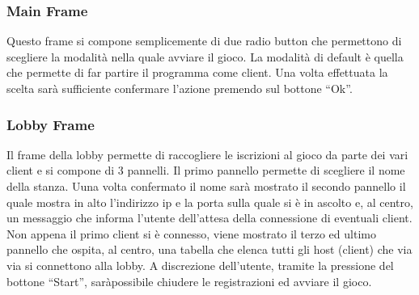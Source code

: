 \subsubsection{Main Frame}
Questo frame si compone semplicemente di due radio button che permettono di
scegliere la modalità nella quale avviare il gioco. La modalità di default è
quella che permette di far partire il programma come client. Una volta
effettuata la scelta sarà sufficiente confermare l'azione premendo sul bottone
``Ok''.

\subsubsection{Lobby Frame}
Il frame della lobby permette di raccogliere le iscrizioni al gioco da parte dei
vari client e si compone di 3 pannelli.\newline
Il primo pannello permette di scegliere il nome della stanza. Uuna volta
confermato il nome sarà mostrato il secondo pannello il quale mostra in alto
l'indirizzo ip e la porta sulla quale si è in ascolto e, al centro, un messaggio
che informa l'utente dell'attesa della connessione di eventuali client. Non
appena il primo client si è connesso, viene mostrato il terzo ed ultimo pannello
che ospita, al centro, una tabella che elenca tutti gli host (client) che via
via si connettono alla lobby. A discrezione dell'utente, tramite la pressione
del bottone ``Start'', saràpossibile chiudere le registrazioni ed avviare il
gioco.

